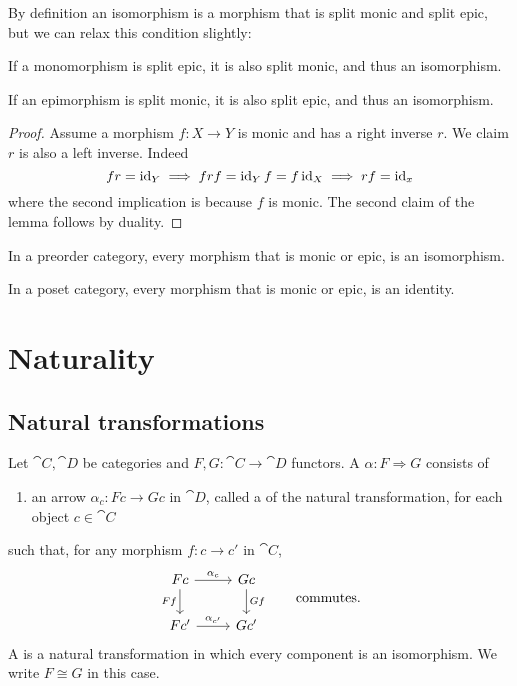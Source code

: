 By definition an isomorphism is a morphism that is split monic and split epic, but we can relax this condition slightly:
\begin{lemma} \label{lemma:singleSplitImpliesDoubleSplit}
If a monomorphism is split epic, it is also split monic, and thus an isomorphism.

If an epimorphism is split monic, it is also split epic, and thus an isomorphism.
\end{lemma}
\begin{proof}
Assume a morphism $f:X\to Y$ is monic and has a right inverse $r$. We claim $r$ is also a left inverse. Indeed
\[ fr = \operatorname{id}_Y \implies frf = \operatorname{id}_Yf = f\operatorname{id}_X \implies rf = \operatorname{id}_x  \]
where the second implication is because $f$ is monic. The second claim of the lemma follows by duality.
\end{proof}


\begin{lemma}
In a preorder category, every morphism that is monic or epic, is an isomorphism.

In a poset category, every morphism that is monic or epic, is an identity.
\end{lemma}






\section{Naturality}
\subsection{Natural transformations}
\begin{definition}
Let $\cat{C}, \cat{D}$ be categories and $F,G: \cat{C}\to \cat{D}$ functors. A  $\alpha: F \Rightarrow G$ consists of
\begin{enumerate}
\item an arrow $\alpha_c: Fc\to Gc$ in $\cat{D}$, called a  of the natural transformation, for each object $c\in \cat{C}$
\end{enumerate}
such that, for any morphism $f:c\to c'$ in $\cat{C}$, 
\[ \begin{tikzcd}
Fc \ar[r, "\alpha_c"] \ar[d, swap, "Ff"] & Gc \ar[d, "Gf"] \\
Fc' \ar[r, "\alpha_{c'}"] & Gc'
\end{tikzcd} \qquad \text{commutes}.\]
A  is a natural transformation in which every component is an isomorphism. We write $F\cong G$ in this case.
\end{definition}

